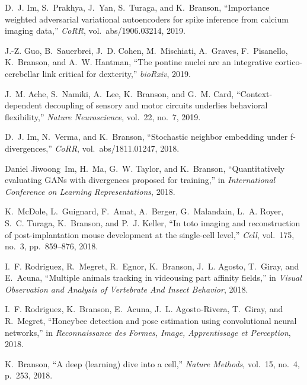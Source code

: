 \begin{cvenum}
\item D.~J. Im, S.~Prakhya, J.~Yan, S.~Turaga, and K.~Branson, ``Importance weighted
  adversarial variational autoencoders for spike inference from calcium imaging
  data,'' {\em CoRR}, vol.~abs/1906.03214, 2019.

\item J.-Z. Guo, B.~Sauerbrei, J.~D. Cohen, M.~Mischiati, A.~Graves, F.~Pisanello,
  K.~Branson, and A.~W. Hantman, ``The pontine nuclei are an integrative
  cortico-cerebellar link critical for dexterity,'' {\em bioRxiv}, 2019.

\item J.~M. Ache, S.~Namiki, A.~Lee, K.~Branson, and G.~M. Card, ``Context-dependent
  decoupling of sensory and motor circuits underlies behavioral flexibility,''
  {\em Nature Neuroscience}, vol.~22, no.~7, 2019.

\item D.~J. Im, N.~Verma, and K.~Branson, ``Stochastic neighbor embedding under
  f-divergences,'' {\em CoRR}, vol.~abs/1811.01247, 2018.

\item Daniel Jiwoong~Im, H.~Ma, G.~W. Taylor, and K.~Branson,
  ``Quantitatively evaluating {GAN}s with divergences proposed for training,''
  in {\em International Conference on Learning Representations},
  2018.

\item K.~McDole, L.~Guignard, F.~Amat, A.~Berger, G.~Malandain, L.~A. Royer, S.~C.
  Turaga, K.~Branson, and P.~J. Keller, ``In toto imaging and reconstruction of
  post-implantation mouse development at the single-cell level,'' {\em Cell},
  vol.~175, no.~3, pp.~859--876, 2018.

\item I.~F. Rodriguez, R.~Megret, R.~Egnor, K.~Branson, J.~L. Agosto, T.~Giray, and
  E.~Acuna, ``Multiple animals tracking in videousing part affinity fields,''
  in {\em Visual Observation and Analysis of Vertebrate And Insect Behavior},
  2018.

\item I.~F. Rodriguez, K.~Branson, E.~Acuna, J.~L. Agosto-Rivera, T.~Giray, and
  R.~Megret, ``Honeybee detection and pose estimation using convolutional
  neural networks,'' in {\em Reconnaissance des Formes, Image, Apprentissage et
  Perception}, 2018.

\item K.~Branson, ``A deep (learning) dive into a cell,'' {\em Nature Methods},
  vol.~15, no.~4, p.~253, 2018.


\end{cvenum}
